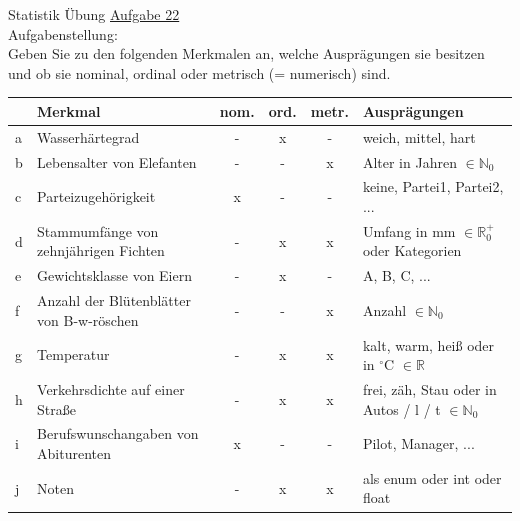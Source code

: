 \documentclass[12pt]{article} %
\newcommand{\aufgabe}[1]{{\huge Statistik Übung \underline{Aufgabe #1}}\\[3.5ex]  }
\begin{document}
\aufgabe{22}
Aufgabenstellung: \\
Geben Sie zu den folgenden Merkmalen an, welche Ausprägungen sie besitzen und ob sie nominal, ordinal oder metrisch (= numerisch) sind. \\[0.5cm]
\begin{tabular}{|l l |c|c|c| l |}
\hline 
~ & Merkmal                                                     & nom. & ord. & metr. & Ausprägungen \\ \hline \hline
a & Wasserhärtegrad                                       & - & x & - & weich, mittel, hart \\ \hline
b & Lebensalter von Elefanten                         & - & - & x & Alter in Jahren $\in \mathbb{N}_0$ \\ \hline
c & Parteizugehörigkeit                                     & x & - & - & keine, Partei1, Partei2, ... \\ \hline
d & Stammumfänge von zehnjährigen Fichten & - & x & x & Umfang in mm $\in \mathbb{R}_{0}^{+}$ oder Kategorien \\ \hline
e & Gewichtsklasse von Eiern                           & - & x & - & A, B, C, ... \\ \hline
f & Anzahl der Blütenblätter von B-w-röschen & - & - & x & Anzahl $\in \mathbb{N}_0$ \\ \hline
g & Temperatur                                                & - & x & x & kalt, warm, heiß oder in $^\circ$C $\in \mathbb{R}$ \\ \hline
h & Verkehrsdichte auf einer Straße                & - & x & x & frei, zäh, Stau oder in Autos / l / t  $\in \mathbb{N}_0$ \\ \hline
i & Berufswunschangaben von Abiturenten     & x & - & - & Pilot, Manager, ... \\ \hline
j & Noten                                                          & - & x & x & als enum oder int oder float \\ \hline  
\end{tabular}
\end{document}
